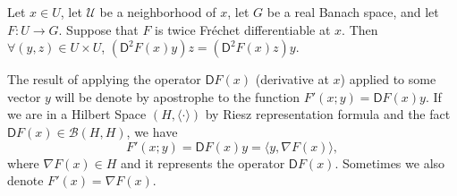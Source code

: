 \begin{fact}[]
	Let $x \in U$, let $\mathcal{U}$ be a neighborhood of $x$, let $G$ be a real Banach
	space, and let $F: U \rightarrow G$. Suppose that $F$ is twice Fr\'echet differentiable at $x$.
	Then $\forall (y,z) \in U \times U$,  $(\mathsf{D}^2 F (x)y)z = (\mathsf{D}^2 F (x)z)y$.
\end{fact}

\begin{remark}[Notation]
	The result of applying the operator $\mathsf{D}F(x)$ (derivative at $x$) applied to some vector $y$ will be denote by apostrophe to the function $F'(x; y)=\mathsf{D}F(x)y$. If we are in a Hilbert Space $(H, \langle \cdot \rangle)$ by Riesz representation formula and the fact $\mathsf{D}F(x) \in \mathcal{B}(H,H)$, we have
	\[
		F'(x; y)=\mathsf{D}F(x)y=\langle y, \nabla F(x) \rangle,
	\]
where $\nabla F(x) \in H$ and it represents the operator $\mathsf{D}F(x)$. Sometimes we also denote $F'(x)=\nabla F(x)$.
\end{remark}


